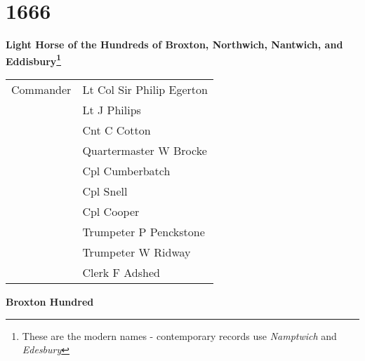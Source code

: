 \chapter*{1666}

\begin{center}
  \Large
  \textbf{Light Horse of the Hundreds of Broxton, Northwich, Nantwich, and Eddisbury\footnote{These are the modern names - contemporary records use \textit{Namptwich} and \textit{Edesbury}}}
\end{center}

\begin{center}
  \begin{tabular}{rl}
    Commander & Lt Col Sir Philip Egerton \\
    & Lt J Philips \\
    & Cnt C Cotton \\
    & Quartermaster W Brocke \\
    & Cpl Cumberbatch \\
    & Cpl Snell \\
    & Cpl Cooper \\
    & Trumpeter P Penckstone \\
    & Trumpeter W Ridway \\
    & Clerk F Adshed \\
  \end{tabular}
\end{center}

\begin{center}
  \Large
  \textbf{Broxton Hundred}
\end{center}

